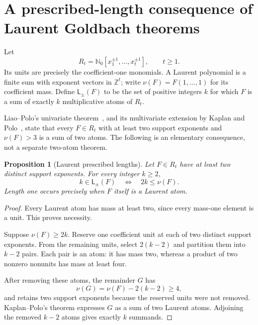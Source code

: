 \documentclass[11pt]{amsart}
\newcommand{\Nzero}{\mathbb N_0}
\newcommand{\Z}{\mathbb Z}
\newcommand{\Llaur}{\mathsf L_{\pm}}
\newtheorem{proposition}[theorem]{Proposition}
\theoremstyle{definition}
\theoremstyle{remark}
\begin{document}
\section{A prescribed-length consequence of Laurent Goldbach theorems}
\label{sec:laurent}

Let
\[
R_t=\Nzero[x_1^{\pm1},\ldots,x_t^{\pm1}],\qquad t\ge1.
\]
Its units are precisely the coefficient-one monomials. A Laurent
polynomial is a finite sum with exponent vectors in $\Z^t$; write
$\nu(F)=F(1,\ldots,1)$ for its coefficient mass. Define $\Llaur(F)$
to be the set of positive integers $k$ for which $F$ is a sum of exactly
$k$ multiplicative atoms of $R_t$.

Liao--Polo's univariate theorem~\cite{LiaoPolo}, and its
multivariate extension by Kaplan and Polo~\cite[Corollary~3.8]{KaplanPolo},
state that every $F\in R_t$ with at least two support exponents and
$\nu(F)>3$ is a sum of two atoms. The following is an elementary
consequence, not a separate two-atom theorem.

\begin{proposition}[Laurent prescribed lengths]\label{prop:laurent}
Let $F\in R_t$ have at least two distinct support exponents. For every
integer $k\ge2$,
\[
k\in\Llaur(F)\quad\Longleftrightarrow\quad2k\le\nu(F).
\]
Length one occurs precisely when $F$ itself is a Laurent atom.
\end{proposition}

\begin{proof}
Every Laurent atom has mass at least two, since every mass-one element
is a unit. This proves necessity.

Suppose $\nu(F)\ge2k$. Reserve one coefficient unit at each of two
distinct support exponents. From the remaining units, select
$2(k-2)$ and partition them into $k-2$ pairs. Each pair is an atom:
it has mass two, whereas a product of two nonzero nonunits has mass
at least four.

After removing these atoms, the remainder $G$ has
\[
\nu(G)=\nu(F)-2(k-2)\ge4,
\]
and retains two support exponents because the reserved units were
not removed. Kaplan--Polo's theorem expresses $G$ as a sum of two
Laurent atoms. Adjoining the removed $k-2$ atoms gives exactly $k$
summands.
\end{proof}
\end{document}
